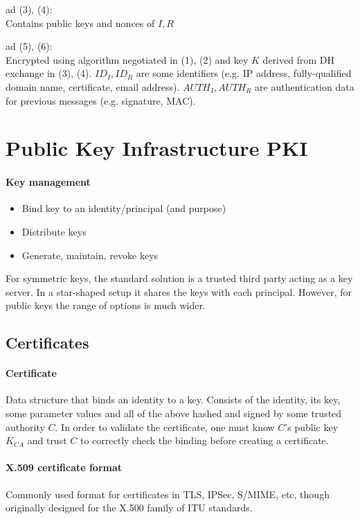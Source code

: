 ad (3), (4):\\
Contains public keys and nonces of $I,R$

ad (5), (6):\\
Encrypted using algorithm negotiated in (1), (2) and key $K$ derived from DH exchange in (3), (4). $ID_I, ID_R$ are some identifiers (e.g. IP address, fully-qualified domain name, certificate, email address). $AUTH_I, AUTH_R$ are authentication data for previous messages (e.g. signature, MAC).



\newpage
\section{Public Key Infrastructure PKI}

\paragraph{Key management}
\begin{itemize}
    \item Bind key to an identity/principal (and purpose)
    \item Distribute keys
    \item Generate, maintain, revoke keys
\end{itemize}
For symmetric keys, the standard solution is a trusted third party acting as a key server. In a star-shaped setup it shares the keys with each principal. However, for public keys the range of options is much wider.

\subsection{Certificates}

\paragraph{Certificate} Data structure that binds an identity to a key. Consists of the identity, its key, some parameter values and all of the above hashed and signed by some trusted authority $C$.
In order to validate the certificate, one must know $C$'s public key $K_{CA}$ and trust $C$ to correctly check the binding before creating a certificate.

\paragraph{X.509 certificate format} Commonly used format for certificates in TLS, IPSec, S/MIME, etc, though originally designed for the X.500 family of ITU standards.

